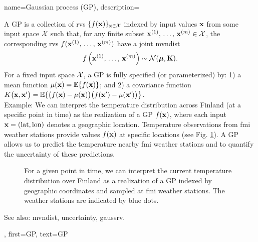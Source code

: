 {name={Gaussian process (GP)},
  description={A GP is a collection of \glspl{rv} 
  	$\{f({\bf x})\}_{{\bf x} \in \mathcal{X}}$ indexed by input values ${\bf x}$ 
  	from some input space $\mathcal{X}$ such that, for any finite subset 
  	${\bf x}^{(1)}, \,\ldots, \,{\bf x}^{(m)} \in \mathcal{X}$, 
  	the corresponding \glspl{rv} $f({\bf x}^{(1)}, \,\ldots, \,{\bf x}^{(m)})$ 
	have a joint \gls{mvndist} 
  	\[
  	f \left( {\bf x}^{(1)}, \,\ldots, \,{\bf x}^{(m)} \right) \sim \mathcal{N}(\boldsymbol{\mu}, \mathbf{K}).
  	\]
  	For a fixed input space $\mathcal{X}$, a GP is fully specified (or parameterized) by: 1) a \gls{mean} \gls{function} $\mu({\bf x}) = \mathbb{E}\{ f({\bf x})\}$;
  	and 2) a \gls{covariance} \gls{function} $K\big({\bf x},{\bf x}'\big)= \mathbb{E}\{ \big(f({\bf x})-\mu({\bf x})\big) \big(f({\bf x}')-\mu({\bf x}')\big) \big\}$.\\
  	Example: We can interpret the temperature distribution across Finland (at a specific 
  	point in time) as the \gls{realization} of a GP $f({\bf x})$, where each input ${\bf x} = (\text{lat}, \text{lon})$ 
  	denotes a geographic location. Temperature observations from \gls{fmi} weather stations provide 
  	values $f({\bf x})$ at specific locations (see Fig. \ref{fig_gp_FMI_dict}). A GP allows us to 
  	predict the temperature nearby \gls{fmi} weather stations and to quantify the \gls{uncertainty} 
  	of these \glspl{prediction}. 
  	\begin{figure}[H]
  	\begin{center}
		\vspace*{-15mm}
	\end{center}
	\caption{For a given point in time, we can interpret the current temperature distribution 
	over Finland as a \gls{realization} of a GP indexed by geographic coordinates and 
	sampled at \gls{fmi} weather stations. The weather stations are indicated by blue dots. \label{fig_gp_FMI_dict}}
	\end{figure}
	See also: \gls{mvndist}, \gls{uncertainty}, \gls{gaussrv}.}, 
  first={GP}, 
  text={GP}
}

